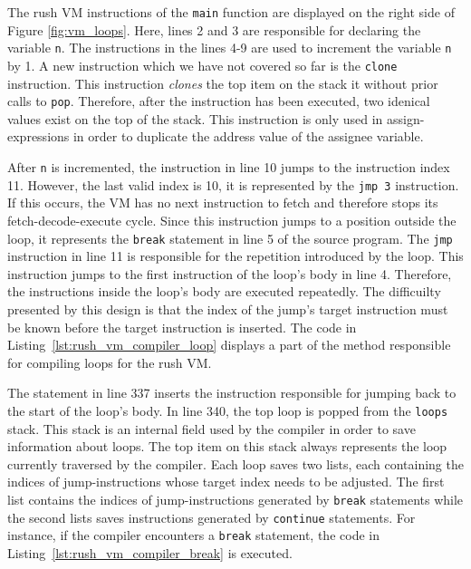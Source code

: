 The rush VM instructions of the \texttt{main} function are displayed on the right side of Figure \ref{fig:vm_loops}.
Here, lines 2 and 3 are responsible for declaring the variable \texttt{n}.
The instructions in the lines 4-9 are used to increment the variable \texttt{n} by 1.
A new instruction which we have not covered so far is the \texttt{clone} instruction.
This instruction \emph{clones} the top item on the stack it without prior calls to \texttt{pop}.
Therefore, after the instruction has been executed, two idenical values exist on the top of the stack.
This instruction is only used in assign-expressions in order to duplicate the address value of the assignee variable.

After \texttt{n} is incremented, the instruction in line 10 jumps to the instruction index 11.
However, the last valid index is 10, it is represented by the \texttt{jmp 3} instruction.
If this occurs, the VM has no next instruction to fetch and therefore stops its fetch-decode-execute cycle.
Since this instruction jumps to a position outside the loop, it represents the \texttt{break} statement in line 5 of the source program.
The \texttt{jmp} instruction in line 11 is responsible for the repetition introduced by the loop.
This instruction jumps to the first instruction of the loop's body in line 4.
Therefore, the instructions inside the loop's body are executed repeatedly.
The difficuilty presented by this design is that the index of the jump's target instruction must be known before the target instruction is inserted.
The code in Listing~\ref{lst:rush_vm_compiler_loop} displays a part of the method responsible for compiling loops for the rush VM.


The statement in line 337 inserts the instruction responsible for jumping back to the start of the loop's body.
In line 340, the top loop is popped from the \texttt{loops} stack.
This stack is an internal field used by the compiler in order to save information about loops.
The top item on this stack always represents the loop currently traversed by the compiler.
Each loop saves two lists, each containing the indices of jump-instructions whose target index needs to be adjusted.
The first list contains the indices of jump-instructions generated by \texttt{break} statements
while the second lists saves instructions generated by \texttt{continue} statements.
For instance, if the compiler encounters a \texttt{break} statement, the code in Listing~\ref{lst:rush_vm_compiler_break} is executed.

